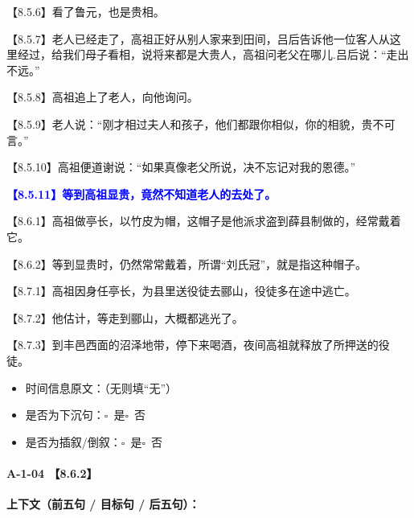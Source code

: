 \documentclass[fontset=none,11pt,a4paper]{ctexart}
\newcommand{\answerline}[1]{\underline{\hspace{#1}}}
\newcommand{\choicebox}[1]{$\square$~#1}
\begin{document}
\noindent 【8.5.6】看了鲁元，也是贵相。\par
\noindent 【8.5.7】老人已经走了，高祖正好从别人家来到田间，吕后告诉他一位客人从这里经过，给我们母子看相，说将来都是大贵人，高祖问老父在哪儿.吕后说：“走出不远。”\par
\noindent 【8.5.8】高祖追上了老人，向他询问。\par
\noindent 【8.5.9】老人说：“刚才相过夫人和孩子，他们都跟你相似，你的相貌，贵不可言。”\par
\noindent 【8.5.10】高祖便道谢说：“如果真像老父所说，决不忘记对我的恩德。”\par
\noindent \textcolor{blue}{\textbf{【8.5.11】等到高祖显贵，竟然不知道老人的去处了。}}\par
\noindent 【8.6.1】高祖做亭长，以竹皮为帽，这帽子是他派求盗到薛县制做的，经常戴着它。\par
\noindent 【8.6.2】等到显贵时，仍然常常戴着，所谓“刘氏冠”，就是指这种帽子。\par
\noindent 【8.7.1】高祖因身任亭长，为县里送役徒去郦山，役徒多在途中逃亡。\par
\noindent 【8.7.2】他估计，等走到郦山，大概都逃光了。\par
\noindent 【8.7.3】到丰邑西面的沼泽地带，停下来喝酒，夜间高祖就释放了所押送的役徒。\par

\begin{itemize}
  \item 时间信息原文：\answerline{7.5cm}（无则填“无”）
  \item 是否为下沉句：\choicebox{是}\quad \choicebox{否}
  \item 是否为插叙/倒叙：\choicebox{是}\quad \choicebox{否}
\end{itemize}

\paragraph{A-1-04 \quad 【8.6.2】}
\textbf{上下文（前五句 / 目标句 / 后五句）：}
\end{document}
